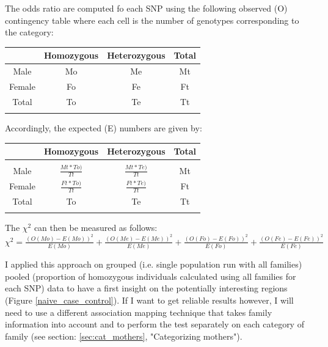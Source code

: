\documentclass[10pt,a4paper]{report}
\begin{document}
The odds ratio are computed fo each SNP using the following observed (O) contingency table where each cell is the number of genotypes corresponding to the category:

\begin{table}[h!]
\begin{tabular}{c|c c c}
& Homozygous & Heterozygous & Total\\
\hline
Male & Mo & Me & Mt\\
Female & Fo & Fe & Ft\\
Total & To & Te & Tt\\
\vspace{5px}
\end{tabular}
\end{table}

Accordingly, the expected  (E) numbers are given by:

\begin{table}[h!]
\begin{tabular}{c|c c c}
& Homozygous & Heterozygous & Total\\[5px]
\hline\\[5px]
Male & $\frac{Mt*To)}{Tt}$ & $\frac{Mt*Te)}{Tt}$ & Mt\\[5px]
Female & $\frac{Ft*To)}{Tt}$ & $\frac{Ft*Te)}{Tt}$ & Ft\\[5px]
Total & To & Te & Tt\\
\vspace{5px}
\end{tabular}
\end{table}

The $\chi^2$ can then be measured as follows:\\
$\chi^2= \frac{(O(Mo)-E(Mo))^2}{E(Mo)} + \frac{(O(Me)-E(Me))^2}{E(Me)} + \frac{(O(Fo)-E(Fo))^2}{E(Fo)} + \frac{(O(Fe)-E(Fe))^2}{E(Fe)}$

I applied this approach on grouped (i.e. single population run with all families) pooled (proportion of homozygous individuals calculated using all families for each SNP) data to have a first insight on the potentially interesting regions (Figure \ref{naive_case_control}). If I want to get reliable results however, I will need to use a different association mapping technique that takes family information into account and to perform the test separately on each category of family (see section: \ref{sec:cat_mothers}, "Categorizing mothers").
\end{document}
